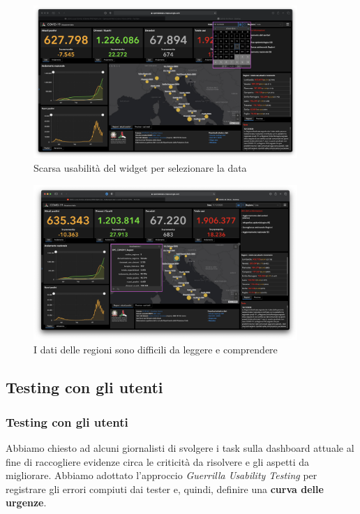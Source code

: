 \documentclass[handout]{beamer}
\begin{document}
			\begin{frame}
				\begin{figure}
					\includegraphics[width=10cm]{img/guidelines_violations_8}
					\caption{Scarsa usabilità del widget per selezionare la data}
				\end{figure}
			\end{frame}

			\begin{frame}
				\begin{figure}
					\includegraphics[width=10cm]{img/guidelines_violations_10}
					\caption{I dati delle regioni sono difficili da leggere e comprendere}
				\end{figure}
			\end{frame}


		\subsection{Testing con gli utenti}

			\begin{frame}
				\frametitle{Testing con gli utenti}
				Abbiamo chiesto ad alcuni giornalisti di svolgere i task sulla dashboard attuale al fine di raccogliere evidenze circa le criticità da risolvere e gli aspetti da migliorare. \newline \newline
				Abbiamo adottato l'approccio \textit{Guerrilla Usability Testing} per registrare gli errori compiuti dai tester e, quindi, definire una \textbf{curva delle urgenze}.
			\end{frame}
\end{document}
